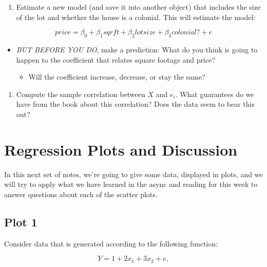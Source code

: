 \documentclass[
]{book}
\providecommand{\tightlist}{%
  \setlength{\itemsep}{0pt}\setlength{\parskip}{0pt}}
\theoremstyle{definition}
\theoremstyle{definition}
\theoremstyle{definition}
\theoremstyle{definition}
\theoremstyle{remark}
\begin{document}
\begin{enumerate}
\def\labelenumi{\arabic{enumi}.}
\setcounter{enumi}{6}
\tightlist
\item
  Estimate a new model (and save it into another object) that includes the size of the lot and whether the house is a colonial. This will estimate the model:
\end{enumerate}

\[ 
price = \beta_{0} + \beta_{1} sqrft + \beta_{2} lotsize + \beta_{3} colonial? + e
\]

\begin{itemize}
\tightlist
\item
  \emph{BUT BEFORE YOU DO}, make a prediction: What do you think is going to happen to the coefficient that relates square footage and price?

  \begin{itemize}
  \tightlist
  \item
    Will the coefficient increase, decrease, or stay the same?
  \end{itemize}
\end{itemize}

\begin{enumerate}
\def\labelenumi{\arabic{enumi}.}
\setcounter{enumi}{6}
\tightlist
\item
  Compute the sample correlation between \(X\) and \(e_i\). What guarantees do we have from the book about this correlation? Does the data seem to bear this out?
\end{enumerate}

\hypertarget{regression-plots-and-discussion}{%
\section{Regression Plots and Discussion}\label{regression-plots-and-discussion}}

In this next set of notes, we're going to give some data, displayed in plots, and we will try to apply what we have learned in the async and reading for this week to answer questions about each of the scatter plots.

\hypertarget{plot-1}{%
\subsection{Plot 1}\label{plot-1}}

Consider data that is generated according to the following function:

\[
  Y = 1 + 2x_1 + 3x_2 + e, 
\]
\end{document}
